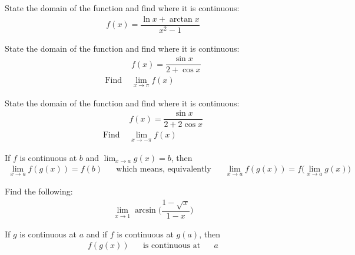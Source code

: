 \begin{exercise}
State the domain of the function and find where it is continuous:
\begin{align*}
    f(x) = \dfrac{\ln x + \arctan x}{x^{2}-1}
\end{align*}
\end{exercise}

\begin{exercise}
State the domain of the function and find where it is continuous:
\begin{align*}
    &f(x) = \dfrac{\sin x}{2 + \cos x}\\
    \text{Find} \hspace{4pt} &\lim_{x \longrightarrow \pi} f(x)
\end{align*}
\end{exercise}

\begin{exercise}
State the domain of the function and find where it is continuous:
\begin{align*}
    &f(x) = \dfrac{\sin x}{2 + 2\cos x}\\
    \text{Find} \hspace{4pt} &\lim_{x \longrightarrow -\pi} f(x)
\end{align*}
\end{exercise}

\begin{theorem}
If $f$ is continuous at $b$ and $\lim_{x \longrightarrow a} g(x) = b$, then
\begin{align*}
    \lim_{x \longrightarrow a} f(g(x)) = f(b) \hspace{20pt} \text{which means, equivalently} \hspace{20pt} \lim_{x \longrightarrow a} f(g(x)) = f\Big(\lim_{x \longrightarrow a} g(x) \Big)
\end{align*}
\label{limit_passes_function}
\end{theorem}

\begin{exercise}
Find the following:
\begin{align*}
    \lim_{x \longrightarrow 1} \arcsin \Big( \dfrac{1 - \sqrt{x}}{1 - x} \Big)
\end{align*}
\end{exercise}

\begin{theorem}
If $g$ is continuous at $a$ and if $f$ is continuous at $g(a)$, then
\begin{align*}
    f(g(x)) \hspace{20pt} \text{is continuous at} \hspace{20pt} a
\end{align*}
\label{continuity_passes_function}
\end{theorem}


